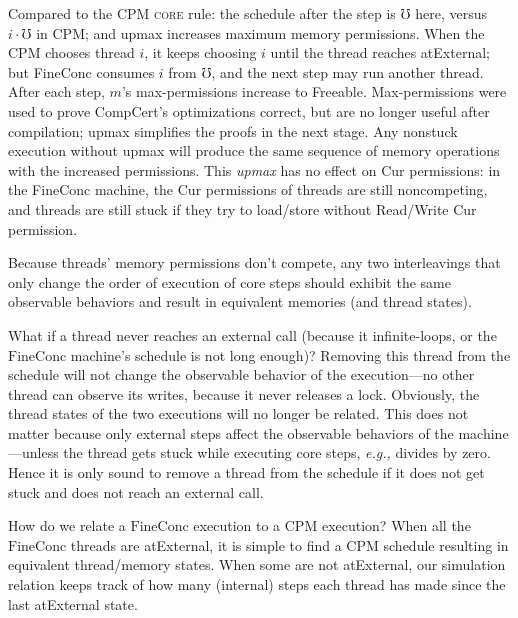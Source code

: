 \vspace{-2ex}
Compared to the CPM \textsc{core} rule:
the schedule after the step is $\mho$ here,
versus $i\cdot \mho$ in CPM;
and upmax increases maximum memory permissions.
When the CPM chooses thread $i$, it keeps choosing $i$
until the thread reaches atExternal; but FineConc
consumes $i$ from $\mho$, and the next step may run another
thread.  After each step, $m$'s max-permissions 
increase to Freeable.  Max-permissions were used
to prove CompCert's optimizations correct, but
are no longer useful after compilation;
upmax simplifies the proofs in the next stage.
Any nonstuck execution without upmax will produce the same
sequence of memory operations with the increased permissions.
This \emph{upmax} has no effect on Cur permissions:
in the FineConc machine, the Cur permissions of
threads are still noncompeting, and threads are still stuck
if they try to load/store without Read/Write Cur permission.

Because threads' memory permissions don't compete,
any two interleavings that only change the order of
execution of core steps should exhibit the same observable behaviors
and result in equivalent memories (and thread states).

What if a thread never reaches an
external call (because it infinite-loops, or the
$\mathrm{FineConc}$ machine's schedule is not long enough)?
Removing this thread from the schedule will not change
the observable behavior of the execution---no other
thread can observe its writes, because it never releases a lock.
Obviously,
the thread states of the two executions will no longer be related.
This does not matter because only
external steps affect the observable behaviors of the machine---unless
the thread gets stuck while executing core steps,
\emph{e.g.,} divides by zero. Hence it is only sound to
remove a thread from the schedule if it does not get stuck and does
not reach an external call.

How do we relate
a $\mathrm{FineConc}$ execution to a $\mathrm{CPM}$ execution?
When all the $\mathrm{FineConc}$ threads are
atExternal, it is simple to find a $\mathrm{CPM}$ schedule
resulting in equivalent thread/memory states.
When some are not atExternal,
our simulation relation keeps track of how many (internal) steps
each thread has made since the last atExternal state.



